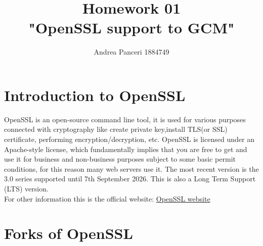 \documentclass{article}
\title{Homework 01\\"OpenSSL support to GCM"}
\author{Andrea Panceri 1884749}
\begin{document}
\maketitle

\section{Introduction to OpenSSL}

OpenSSL is an open-source command line tool, it is used for various purposes connected with cryptography like create private key,install TLS(or SSL) certificate, performing encryption/decryption, etc. OpenSSL is licensed under an Apache-style license, which fundamentally implies that you are free to get and use it for business and non-business purposes subject to some basic permit conditions, for this reason many web servers use it. The most recent version is the 3.0 series supported until 7th September 2026. This is also a Long Term Support (LTS) version.\\For other information this is the official website: \href{https://www.openssl.org/}{OpenSSL website}

\section{Forks of OpenSSL}
\end{document}
